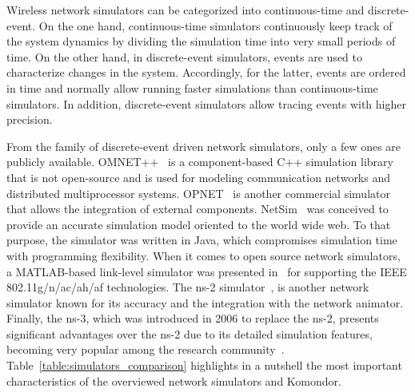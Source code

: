 \documentclass[conference]{IEEEtran}
\begin{document}
	Wireless network simulators can be categorized into continuous-time and discrete-event. On the one hand, continuous-time simulators continuously keep track of the system dynamics by dividing the simulation time into very small periods of time. On the other hand, in discrete-event simulators, events are used to characterize changes in the system. Accordingly, for the latter, events are ordered in time and normally allow running faster simulations than continuous-time simulators. In addition, discrete-event simulators allow tracing events with higher precision.
	
	From the family of discrete-event driven network simulators, only a few ones are publicly available. OMNET++~\cite{varga2008overview} is a component-based C++ simulation library that is not open-source and is used for modeling communication networks and distributed multiprocessor systems. OPNET~\cite{modeler2009opnet} is another commercial simulator that allows the integration of external components. NetSim~\cite{rathi1990new} was conceived to provide an accurate simulation model oriented to the world wide web. To that purpose, the simulator was written in Java, which compromises simulation time with programming flexibility. When it comes to open source network simulators, a MATLAB-based link-level simulator was presented in~\cite{milos2016link} for supporting the IEEE 802.11g/n/ac/ah/af technologies. The ns-2 simulator~\cite{issariyakul2012introduction}, is another network simulator known for its accuracy and the integration with the network animator. Finally, the ns-3, which was introduced in 2006 to replace the ns-2, presents significant advantages over the ns-2 due to its detailed simulation features, becoming very popular among the research community~\cite{riley2010ns}. Table~\ref{table:simulators_comparison} highlights in a nutshell the most important characteristics of the overviewed network simulators and Komondor. 
	
\end{document}
